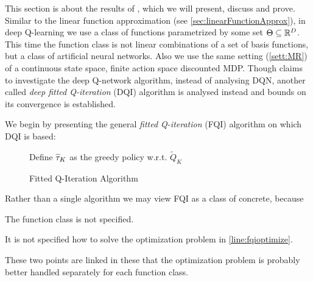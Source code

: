 This section is about the results of ,
which we will present, discuss and prove.
Similar to the linear function approximation
(see \cref{sec:linearFunctionApprox}), in deep Q-learning
we use a class of functions parametrized by some set $\Theta \subseteq \mathbb{R}^D$.
This time the function class is not linear combinations of a set of
basis functions, but a class of artificial neural networks.
Also we use the same setting (\cref{sett:MR}) of a
continuous state space, finite action space discounted MDP.
Though  claims to investigate the deep Q-network algorithm,
instead of analysing DQN,
another called \emph{deep fitted Q-iteration} (DQI) algorithm is
analysed instead and bounds on its convergence is established.

We begin by presenting the general \emph{fitted Q-iteration} (FQI) algorithm
on which DQI is based:
\begin{figure}[H]
\begin{algorithm}[H] %
  \caption{Fitted Q-Iteration Algorithm}
  Define $\widetilde{\tau}_K$ as the greedy policy w.r.t. $\widetilde{Q}_K$ \\
  \label{alg:fqi}
\end{algorithm}
\end{figure}
\begin{rem}
  Rather than a single algorithm we may view
  FQI as a class of concrete, because
  \begin{enumerate*}[label=(\arabic*.)]
    \item The function class is not specified.
    \item It is not specified how to solve the optimization problem
      in \cref{line:fqioptimize}.
  \end{enumerate*}
  These two points are linked in these that the optimization problem
  is probably better handled separately for each function class.
\end{rem}

